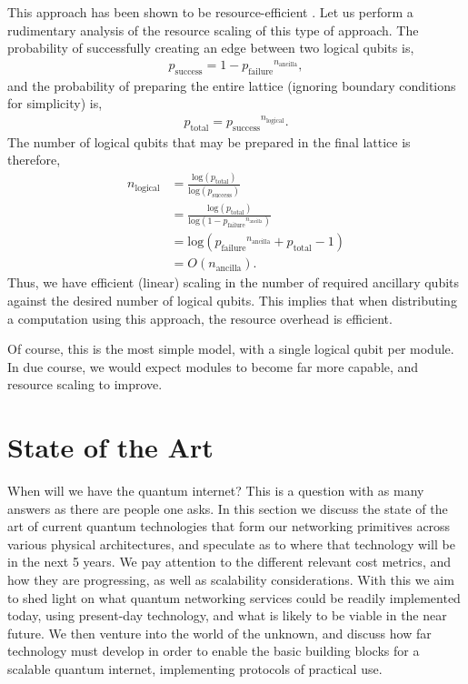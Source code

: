 \documentclass[aps,rmp,twocolumn,amsmath,amssymb,nofootinbib,superscriptaddress]{revtex4}
\newcommand{\comment}[1]{{\color{blue}{\textbf{#1}}}}
\begin{document}
This approach has been shown to be resource-efficient \cite{nielsenoptcs}. Let us perform a rudimentary analysis of the resource scaling of this type of approach. The probability of successfully creating an edge between two logical qubits is,
\begin{align}
p_\mathrm{success} = 1 - {p_\mathrm{failure}}^{n_\mathrm{ancilla}},
\end{align}
and the probability of preparing the entire lattice (ignoring boundary conditions for simplicity) is,
\begin{align}
p_\mathrm{total} = {p_\mathrm{success}}^{n_\mathrm{logical}}.
\end{align}
The number of logical qubits that may be prepared in the final lattice is therefore,
\begin{align}
n_\mathrm{logical} &= \frac{\mathrm{log}(p_\mathrm{total})}{\mathrm{log}(p_\mathrm{success})} \nonumber \\
&= \frac{\mathrm{log}(p_\mathrm{total})}{\mathrm{log}(1 - {p_\mathrm{failure}}^{n_\mathrm{ancilla}})} \nonumber \\
&= \mathrm{log}({p_\mathrm{failure}}^{n_\mathrm{ancilla}} + p_\mathrm{total} - 1) \nonumber \\
&= O(n_\mathrm{ancilla}).
\end{align}
Thus, we have efficient (linear) scaling in the number of required ancillary qubits against the desired number of logical qubits. This implies that when distributing a computation using this approach, the resource overhead is efficient.
\comment{Check this!}

Of course, this is the most simple model, with a single logical qubit per module. In due course, we would expect modules to become far more capable, and resource scaling to improve.

%
%

\section{State of the Art}

\comment{TO DO by Shanghai group}

When will we have the quantum internet? This is a question with as many answers as there are people one asks. In this section we discuss the state of the art of current quantum technologies that form our networking primitives across various physical architectures, and speculate as to where that technology will be in the next 5 years. We pay attention to the different relevant cost metrics, and how they are progressing, as well as scalability considerations. With this we aim to shed light on what quantum networking services could be readily implemented today, using present-day technology, and what is likely to be viable in the near future. We then venture into the world of the unknown, and discuss how far technology must develop in order to enable the basic building blocks for a scalable quantum internet, implementing protocols of practical use.
\end{document}
